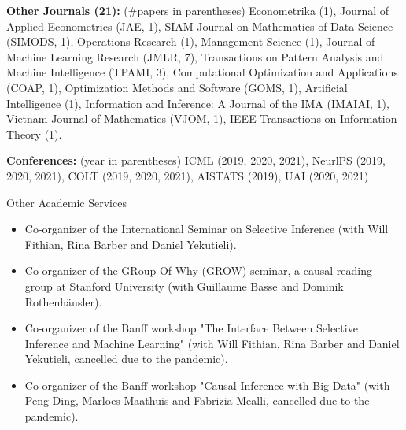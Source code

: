 \documentclass{article}
\begin{document}
\vspace{2mm}
\noindent \textbf{Other Journals (21): }(\#papers in parentheses) Econometrika (1), Journal of Applied Econometrics (JAE, 1), SIAM Journal on Mathematics of Data Science (SIMODS, 1), Operations Research (1), Management Science (1), Journal of Machine Learning Research (JMLR, 7), Transactions on Pattern Analysis and Machine Intelligence (TPAMI, 3), Computational Optimization and Applications (COAP, 1), Optimization Methods and Software (GOMS, 1), Artificial Intelligence (1), Information and Inference: A Journal of the IMA (IMAIAI, 1), Vietnam Journal of Mathematics (VJOM, 1), IEEE Transactions on Information Theory (1).

\vspace{2mm}
\noindent \textbf{Conferences: }(year in parentheses) ICML (2019, 2020, 2021), NeurlPS (2019, 2020, 2021), COLT (2019, 2020, 2021), AISTATS (2019), UAI (2020, 2021)

\vspace{5mm}
\begin{large}
\noindent Other Academic Services
\end{large}

\begin{itemize}
\item Co-organizer of the International Seminar on Selective Inference (with Will Fithian, Rina Barber and Daniel Yekutieli).
\item Co-organizer of the GRoup-Of-Why (GROW) seminar, a causal reading group at Stanford University (with Guillaume Basse and Dominik Rothenhäusler).
\item Co-organizer of the Banff workshop "The Interface Between Selective Inference and Machine Learning" (with Will Fithian, Rina Barber and Daniel Yekutieli, cancelled due to the pandemic).
\item Co-organizer of the Banff workshop "Causal Inference with Big Data" (with Peng Ding, Marloes Maathuis and Fabrizia Mealli, cancelled due to the pandemic).
\end{itemize}
\end{document}
